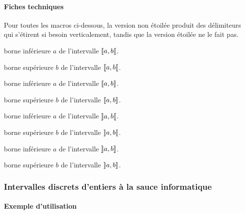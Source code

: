\documentclass[12pt,a4paper]{article}
\begin{document}
\paragraph{Fiches techniques}

Pour toutes les macros ci-dessous, la version non étoilée produit des délimiteurs qui s'étirent si besoin verticalement, tandis que la version étoilée ne le fait pas.


\bigskip





 borne inférieure $a$ de l'intervalle $\ZintervalCO{a}{b}$.

 borne supérieure $b$ de l'intervalle $\ZintervalCO{a}{b}$.


\bigskip




 borne inférieure $a$ de l'intervalle $\ZintervalC{a}{b}$.

 borne supérieure $b$ de l'intervalle $\ZintervalC{a}{b}$.


\bigskip




 borne inférieure $a$ de l'intervalle $\ZintervalO{a}{b}$.

 borne supérieure $b$ de l'intervalle $\ZintervalO{a}{b}$.


\bigskip




 borne inférieure $a$ de l'intervalle $\ZintervalOC{a}{b}$.

 borne supérieure $b$ de l'intervalle $\ZintervalOC{a}{b}$.



\subsubsection{Intervalles discrets d'entiers à la sauce \og informatique \fg}

\paragraph{Exemple d'utilisation}
\end{document}
